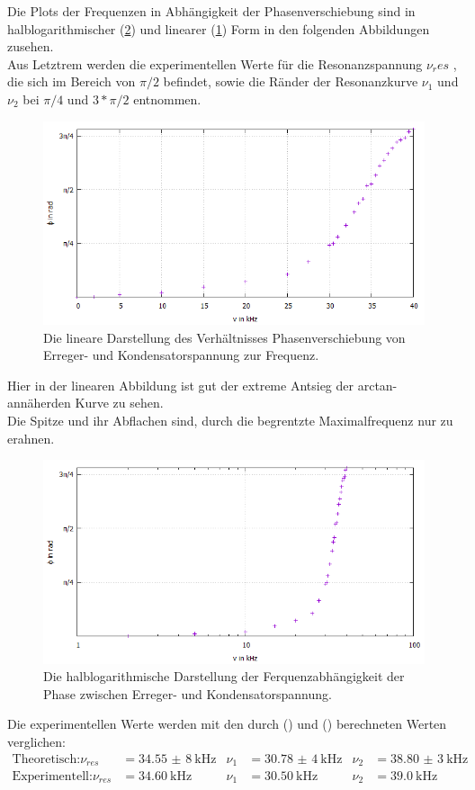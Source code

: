 Die Plots der Frequenzen in Abhängigkeit der Phasenverschiebung sind in halblogarithmischer (\ref{fig:Halb2}) und linearer (\ref{fig:Linear2}) Form in den folgenden Abbildungen zusehen.\\
Aus Letztrem werden die experimentellen Werte für die Resonanzspannung $\nu_res$ , die sich im Bereich von $\pi/2$ befindet, sowie die Ränder der Resonanzkurve $\nu_1$ und $\nu_2$ bei $\pi/4$ und $3*\pi/2$ entnommen.
\begin{figure}
  \centering
  \includegraphics[width=\textwidth]{Linear2.jpeg}
  \caption{Die lineare Darstellung des Verhältnisses Phasenverschiebung von Erreger- und Kondensatorspannung zur Frequenz.}
  \label{fig:Linear2}
\end{figure}
Hier in der linearen Abbildung ist gut der extreme Antsieg der arctan-annäherden Kurve zu sehen.\\Die Spitze und ihr Abflachen sind, durch die begrentzte Maximalfrequenz nur zu erahnen.
\begin{figure}
  \centering
  \includegraphics[width=\textwidth]{Halblog2.jpeg}
  \caption{Die halblogarithmische Darstellung der Ferquenzabhängigkeit der Phase zwischen Erreger- und Kondensatorspannung.}
  \label{fig:Halb2}
\end{figure}
\newpage
Die experimentellen Werte werden mit den durch () und () berechneten Werten verglichen:
\begin{align*}
  \text{Theoretisch:}\nu_{res} &= \SI{34,55(8)}{\kilo\hertz} & \nu_1 &= \SI{30,78(4)}{\kilo\hertz} & \nu_2 &= \SI{38,80(3)}{\kilo\hertz}\\
  \text{Experimentell:}\nu_{res} &= \SI{34,60}{\kilo\hertz} & \nu_1 &= \SI{30,50}{\kilo\hertz} & \nu_2 &= \SI{39,0}{\kilo\hertz}
\end{align*}
 
